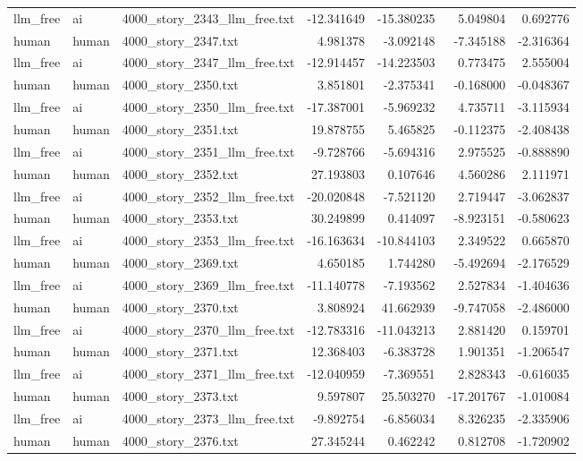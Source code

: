 \begin{longtable}{lllrrrr}
llm\_free & ai & 4000\_story\_2343\_llm\_free.txt & -12.341649 & -15.380235 & 5.049804 & 0.692776 \\
human & human & 4000\_story\_2347.txt & 4.981378 & -3.092148 & -7.345188 & -2.316364 \\
llm\_free & ai & 4000\_story\_2347\_llm\_free.txt & -12.914457 & -14.223503 & 0.773475 & 2.555004 \\
human & human & 4000\_story\_2350.txt & 3.851801 & -2.375341 & -0.168000 & -0.048367 \\
llm\_free & ai & 4000\_story\_2350\_llm\_free.txt & -17.387001 & -5.969232 & 4.735711 & -3.115934 \\
human & human & 4000\_story\_2351.txt & 19.878755 & 5.465825 & -0.112375 & -2.408438 \\
llm\_free & ai & 4000\_story\_2351\_llm\_free.txt & -9.728766 & -5.694316 & 2.975525 & -0.888890 \\
human & human & 4000\_story\_2352.txt & 27.193803 & 0.107646 & 4.560286 & 2.111971 \\
llm\_free & ai & 4000\_story\_2352\_llm\_free.txt & -20.020848 & -7.521120 & 2.719447 & -3.062837 \\
human & human & 4000\_story\_2353.txt & 30.249899 & 0.414097 & -8.923151 & -0.580623 \\
llm\_free & ai & 4000\_story\_2353\_llm\_free.txt & -16.163634 & -10.844103 & 2.349522 & 0.665870 \\
human & human & 4000\_story\_2369.txt & 4.650185 & 1.744280 & -5.492694 & -2.176529 \\
llm\_free & ai & 4000\_story\_2369\_llm\_free.txt & -11.140778 & -7.193562 & 2.527834 & -1.404636 \\
human & human & 4000\_story\_2370.txt & 3.808924 & 41.662939 & -9.747058 & -2.486000 \\
llm\_free & ai & 4000\_story\_2370\_llm\_free.txt & -12.783316 & -11.043213 & 2.881420 & 0.159701 \\
human & human & 4000\_story\_2371.txt & 12.368403 & -6.383728 & 1.901351 & -1.206547 \\
llm\_free & ai & 4000\_story\_2371\_llm\_free.txt & -12.040959 & -7.369551 & 2.828343 & -0.616035 \\
human & human & 4000\_story\_2373.txt & 9.597807 & 25.503270 & -17.201767 & -1.010084 \\
llm\_free & ai & 4000\_story\_2373\_llm\_free.txt & -9.892754 & -6.856034 & 8.326235 & -2.335906 \\
human & human & 4000\_story\_2376.txt & 27.345244 & 0.462242 & 0.812708 & -1.720902 \\

\end{longtable}
